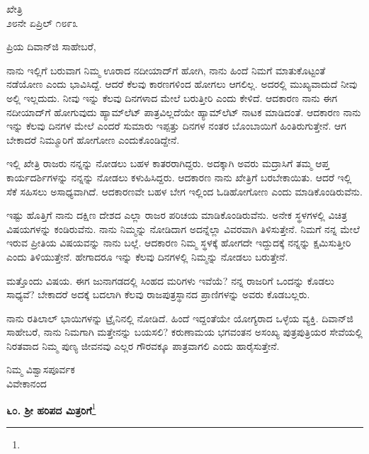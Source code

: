 \vspace{-0.5cm}

\begin{flushright}
ಖೇತ್ರಿ\\೨೮ನೇ ಏಪ್ರಿಲ್ ೧೮೯೩
\end{flushright}
\vspace{-0.3cm}

\noindent
ಪ್ರಿಯ ದಿವಾನ್‌ಜಿ ಸಾಹೇಬರೆ,

ನಾನು ಇಲ್ಲಿಗೆ ಬರುವಾಗ ನಿಮ್ಮ ಊರಾದ ನದೀಯಾದ್‌ಗೆ ಹೋಗಿ, ನಾನು ಹಿಂದೆ ನಿಮಗೆ ಮಾತುಕೊಟ್ಟಂತೆ ನಡೆಯೋಣ ಎಂದು ಭಾವಿಸಿದ್ದೆ. ಆದರೆ ಕೆಲವು ಕಾರಣಗಳಿಂದ ಹೋಗಲು ಆಗಲಿಲ್ಲ. ಅದರಲ್ಲಿ ಮುಖ್ಯವಾದುದೆ ನೀವು ಅಲ್ಲಿ ಇಲ್ಲದುದು. ನೀವು ಇನ್ನು ಕೆಲವು ದಿನಗಳಾದ ಮೇಲೆ ಬರುತ್ತೀರಿ ಎಂದು ಕೇಳಿದೆ. ಆದಕಾರಣ ನಾನು ಈಗ ನದೀಯಾದ್‌ಗೆ ಹೋಗುವುದು ಹ್ಯಾಮ್‌ಲೆಟ್ ಪಾತ್ರವಿಲ್ಲದೆಯೇ ಹ್ಯಾಮ್‌ಲೆಟ್ ನಾಟಕ ಮಾಡಿದಂತೆ. ಆದಕಾರಣ ನಾನು ಇನ್ನು ಕೆಲವು ದಿನಗಳ ಮೇಲೆ ಎಂದರೆ ಸುಮಾರು ಇಪ್ಪತ್ತು ದಿನಗಳ ನಂತರ ಬೊಂಬಾಯಿಗೆ ಹಿಂತಿರುಗುತ್ತೇನೆ. ಆಗ ಬೇಕಾದರೆ ನಿಮ್ಮೂರಿಗೆ ಹೋಗೋಣ ಎಂದುಕೊಂಡಿದ್ದೇನೆ.

ಇಲ್ಲಿ ಖೇತ್ರಿ ರಾಜರು ನನ್ನನ್ನು ನೋಡಲು ಬಹಳ ಕಾತರರಾಗಿದ್ದರು. ಅದಕ್ಕಾಗಿ ಅವರು ಮದ್ರಾಸಿಗೆ ತಮ್ಮ ಆಪ್ತ ಕಾರ್ಯದರ್ಶಿಗಳನ್ನು ನನ್ನನ್ನು ನೋಡಲು ಕಳುಹಿಸಿದ್ದರು. ಆದಕಾರಣ ನಾನು ಖೇತ್ರಿಗೆ ಬರಬೇಕಾಯಿತು. ಆದರೆ ಇಲ್ಲಿ ಸೆಕೆ ಸಹಿಸಲು ಅಸಾಧ್ಯವಾಗಿದೆ. ಆದಕಾರಣವೇ ಬಹಳ ಬೇಗ ಇಲ್ಲಿಂದ ಓಡಿಹೋಗೋಣ ಎಂದು ಮಾಡಿಕೊಂಡಿರುವೆನು.

ಇಷ್ಟು ಹೊತ್ತಿಗೆ ನಾನು ದಕ್ಷಿಣ ದೇಶದ ಎಲ್ಲಾ ರಾಜರ ಪರಿಚಯ ಮಾಡಿಕೊಂಡಿರುವೆನು. ಅನೇಕ ಸ್ಥಳಗಳಲ್ಲಿ ವಿಚಿತ್ರ ವಿಷಯಗಳನ್ನು ಕಂಡಿರುವೆನು. ನಾನು ನಿಮ್ಮನ್ನು ನೋಡಿದಾಗ ಅದನ್ನೆಲ್ಲಾ ವಿವರವಾಗಿ ತಿಳಿಸುತ್ತೇನೆ. ನಿಮಗೆ ನನ್ನ ಮೇಲೆ ಇರುವ ಪ್ರೀತಿಯ ವಿಷಯವನ್ನು ನಾನು ಬಲ್ಲೆ. ಆದಕಾರಣ ನಿಮ್ಮ ಸ್ಥಳಕ್ಕೆ ಹೋಗದೇ ಇದ್ದುದಕ್ಕೆ ನನ್ನನ್ನು ಕ್ಷಮಿಸುತ್ತೀರಿ ಎಂದು ತಿಳಿಯುತ್ತೇನೆ. ಹೇಗಾದರೂ ಇನ್ನು ಕೆಲವು ದಿನಗಳಲ್ಲಿ ನಿಮ್ಮನ್ನು ನೋಡಲು ಬರುತ್ತೇನೆ.

ಮತ್ತೊಂದು ವಿಷಯ. ಈಗ ಜುನಾಗಡದಲ್ಲಿ ಸಿಂಹದ ಮರಿಗಳು ಇವೆಯೆ? ನನ್ನ ರಾಜರಿಗೆ ಒಂದನ್ನು ಕೊಡಲು ಸಾಧ್ಯವೆ? ಬೇಕಾದರೆ ಅದಕ್ಕೆ ಬದಲಾಗಿ ಕೆಲವು ರಾಜಪುತ್ರಸ್ಥಾನದ ಪ್ರಾಣಿಗಳನ್ನು ಅವರು ಕೊಡಬಲ್ಲರು.

ನಾನು ರತಿಲಾಲ್ ಭಾಯಿಗಳನ್ನು ಟ್ರೈನಿನಲ್ಲಿ ನೋಡಿದೆ. ಹಿಂದೆ ಇದ್ದಂತೆಯೇ ಯೋಗ್ಯರಾದ ಒಳ್ಳೆಯ ವ್ಯಕ್ತಿ. ದಿವಾನ್‌ಜಿ ಸಾಹೇಬರೆ, ನಾನು ನಿಮಗಾಗಿ ಮತ್ತೇನನ್ನು ಬಯಸಲಿ? ಕರುಣಾಮಯ ಭಗವಂತನ ಅಸಂಖ್ಯ ಪುತ್ರ\enginline{-}ಪುತ್ರಿಯರ ಸೇವೆಯಲ್ಲಿ ನಿರತವಾದ ನಿಮ್ಮ ಪುಣ್ಯ ಜೀವನವು ಎಲ್ಲರ ಗೌರವಕ್ಕೂ ಪಾತ್ರವಾಗಲಿ ಎಂದು ಹಾರೈಸುತ್ತೇನೆ.

\vspace{-0.4cm}

{\flushright
ನಿಮ್ಮ ವಿಶ್ವಾಸಪೂರ್ವಕ\\ವಿವೇಕಾನಂದ\par}

\begin{center}
\textbf{೬೦. ಶ‍್ರೀ ಹರಿಪದ ಮಿತ್ರರಿಗೆ}\footnote{}
\end{center}

